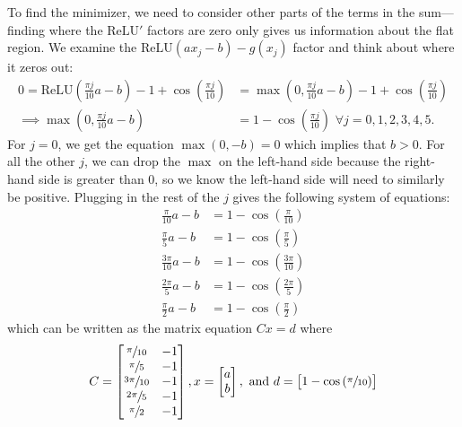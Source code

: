 \documentclass{letter}
\newcommand{\relu}{\mathrm{ReLU}}
\begin{document}
{    To find the minimizer, we need to consider other parts of the terms in the sum---finding where the $\relu'$ factors are zero only gives us information about the flat region. We examine the $\relu(ax_j - b) - g(x_j)$ factor and think about where it zeros out: \begin{align*}
        0 = \relu\left(\frac{\pi j}{10}a - b\right) - 1 + \cos\left(\frac{\pi j}{10}\right) &= \max\left(0, \frac{\pi j}{10}a - b\right) - 1 + \cos\left(\frac{\pi j}{10}\right) \\
        \implies \max\left(0, \frac{\pi j}{10}a - b\right) &= 1 - \cos\left(\frac{\pi j}{10}\right) \, \, \forall j = 0, 1, 2, 3, 4, 5.
    \end{align*} For $j = 0$, we get the equation $\max(0, -b) = 0$ which implies that $b > 0$. For all the other $j$, we can drop the $\max$ on the left-hand side because the right-hand side is greater than 0, so we know the left-hand side will need to similarly be positive. Plugging in the rest of the $j$ gives the following system of equations: \begin{align*}
            \frac{\pi}{10}a - b &= 1 - \cos\left(\frac{\pi}{10}\right) \\
            \frac{\pi}{5}a - b &= 1 - \cos\left(\frac{\pi}{5}\right) \\
            \frac{3\pi}{10}a - b &= 1 - \cos\left(\frac{3\pi}{10}\right) \\
            \frac{2\pi}{5}a - b &= 1 - \cos\left(\frac{2\pi}{5}\right) \\
            \frac{\pi}{2}a - b &= 1 - \cos\left(\frac{\pi}{2}\right) 
    \end{align*} which can be written as the matrix equation $Cx = d$ where \begin{align*}
        C = \begin{bmatrix} \sfrac{\pi}{10} & -1 \\
            \sfrac{\pi}{5} & -1 \\
            \sfrac{3\pi}{10} & -1 \\
            \sfrac{2\pi}{5} & -1 \\
            \sfrac{\pi}{2} & -1 \\
        \end{bmatrix}, x = \begin{bmatrix} a \\ b \end{bmatrix}, \text{ and }
        d = \begin{bmatrix}  
            1 - \cos\left(\sfrac{\pi}{10}\right) \\ 

\end{bmatrix}
\end{align*}}
\end{document}
